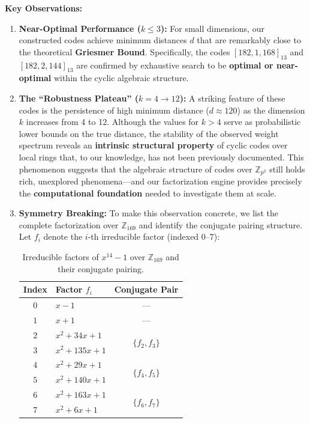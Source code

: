 \documentclass[12pt]{article}
\theoremstyle{plain}
\numberwithin{equation}{section}
\begin{document}
\noindent \textbf{Key Observations:}
\begin{enumerate}
    \item \textbf{Near-Optimal Performance ($k \le 3$):}
    For small dimensions, our constructed codes achieve minimum distances $d$ that are remarkably close to the theoretical \textbf{Griesmer Bound}. Specifically, the codes $[182, 1, 168]_{13}$ and $[182, 2, 144]_{13}$ are confirmed by exhaustive search to be \textbf{optimal or near-optimal} within the cyclic algebraic structure.

    \item \textbf{The ``Robustness Plateau'' ($k=4 \to 12$):}
    A striking feature of these codes is the persistence of high minimum distance ($d \approx 120$) as the dimension $k$ increases from 4 to 12. Although the values for $k>4$ serve as probabilistic lower bounds on the true distance, the stability of the observed weight spectrum reveals an \textbf{intrinsic structural property} of cyclic codes over local rings that, to our knowledge, has not been previously documented. This phenomenon suggests that the algebraic structure of codes over $\mathbb{Z}_{p^2}$ still holds rich, unexplored phenomena---and our factorization engine provides precisely the \textbf{computational foundation} needed to investigate them at scale.

    \item \textbf{Symmetry Breaking:}
    To make this observation concrete, we list the complete factorization over $\mathbb{Z}_{169}$ and identify the conjugate pairing structure. Let $f_i$ denote the $i$-th irreducible factor (indexed $0$--$7$):

    \begin{table}[h]
    \centering
    \caption{Irreducible factors of $x^{14}-1$ over $\mathbb{Z}_{169}$ and their conjugate pairing.}
    \label{tab:factors}
    \renewcommand{\arraystretch}{1.2}
    \begin{tabular}{c|l|c}
    \hline
    \textbf{Index} & \textbf{Factor $f_i$} & \textbf{Conjugate Pair} \\
    \hline
    $0$ & $x - 1$ & --- \\
    $1$ & $x + 1$ & --- \\
    $2$ & $x^2 + 34x + 1$ & \multirow{2}{*}{$\{f_2, f_3\}$} \\
    $3$ & $x^2 + 135x + 1$ &  \\
    $4$ & $x^2 + 29x + 1$ & \multirow{2}{*}{$\{f_4, f_5\}$} \\
    $5$ & $x^2 + 140x + 1$ &  \\
    $6$ & $x^2 + 163x + 1$ & \multirow{2}{*}{$\{f_6, f_7\}$} \\
    $7$ & $x^2 + 6x + 1$ &  \\
    \hline
    \end{tabular}
    \end{table}
    

\end{enumerate}
\end{document}
